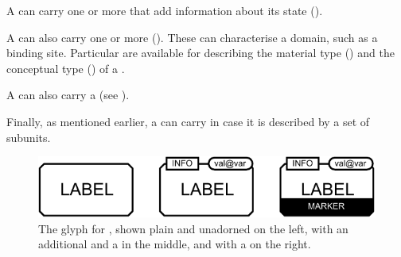 \begin{glyphDescription}
\glyphAux
A  can carry one or more  that add information about its state ().

A  can also carry one or more  ().
These can characterise a domain, such as a binding site.
Particular  are available for describing the material type () and the conceptual type () of a .

A  can also carry a  (see ).

Finally, as mentioned earlier, a  can carry  in case it is described by a set of subunits.

\end{glyphDescription}

\begin{figure}[H]
  \centering
  \includegraphics{images/build/complex_combined.pdf}
  \caption{The \PD glyph for , shown plain and unadorned on the left, with an additional  and a  in the middle, and with a  on the right.}
  \label{fig:complex}
\end{figure}
